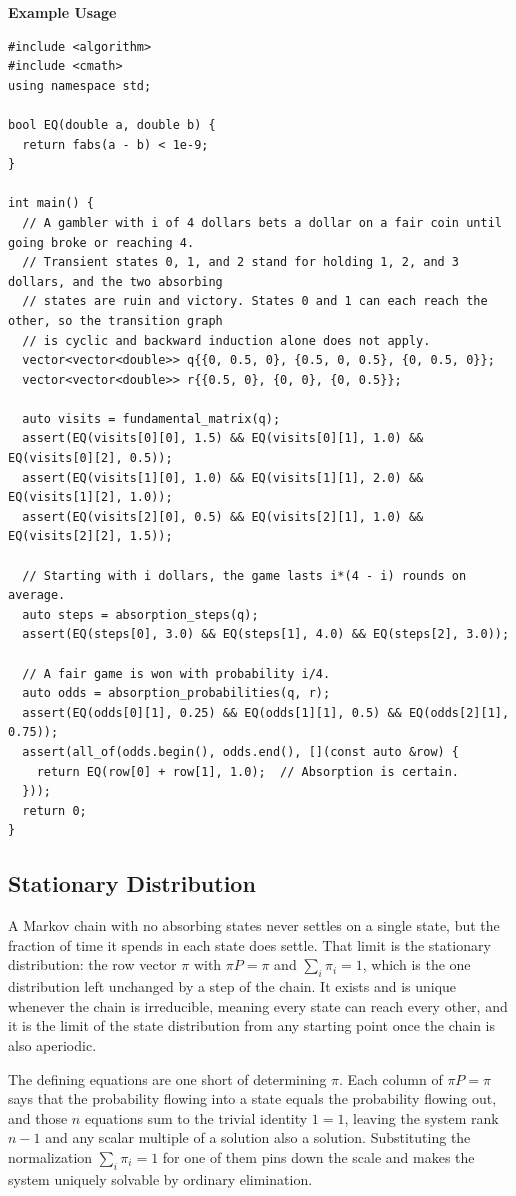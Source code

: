 \textbf{Example Usage}\par
\begin{lstlisting}[style=cpp]
#include <algorithm>
#include <cmath>
using namespace std;

bool EQ(double a, double b) {
  return fabs(a - b) < 1e-9;
}

int main() {
  // A gambler with i of 4 dollars bets a dollar on a fair coin until going broke or reaching 4.
  // Transient states 0, 1, and 2 stand for holding 1, 2, and 3 dollars, and the two absorbing
  // states are ruin and victory. States 0 and 1 can each reach the other, so the transition graph
  // is cyclic and backward induction alone does not apply.
  vector<vector<double>> q{{0, 0.5, 0}, {0.5, 0, 0.5}, {0, 0.5, 0}};
  vector<vector<double>> r{{0.5, 0}, {0, 0}, {0, 0.5}};

  auto visits = fundamental_matrix(q);
  assert(EQ(visits[0][0], 1.5) && EQ(visits[0][1], 1.0) && EQ(visits[0][2], 0.5));
  assert(EQ(visits[1][0], 1.0) && EQ(visits[1][1], 2.0) && EQ(visits[1][2], 1.0));
  assert(EQ(visits[2][0], 0.5) && EQ(visits[2][1], 1.0) && EQ(visits[2][2], 1.5));

  // Starting with i dollars, the game lasts i*(4 - i) rounds on average.
  auto steps = absorption_steps(q);
  assert(EQ(steps[0], 3.0) && EQ(steps[1], 4.0) && EQ(steps[2], 3.0));

  // A fair game is won with probability i/4.
  auto odds = absorption_probabilities(q, r);
  assert(EQ(odds[0][1], 0.25) && EQ(odds[1][1], 0.5) && EQ(odds[2][1], 0.75));
  assert(all_of(odds.begin(), odds.end(), [](const auto &row) {
    return EQ(row[0] + row[1], 1.0);  // Absorption is certain.
  }));
  return 0;
}
\end{lstlisting}
\subsection{Stationary Distribution}
\label{sec:6.7.4}
A Markov chain with no absorbing states never settles on a single state, but the fraction of time it spends in each state does settle. That limit is the stationary distribution: the row vector $\pi$ with $\pi P = \pi$ and $\sum_i \pi_i = 1$, which is the one distribution left unchanged by a step of the chain. It exists and is unique whenever the chain is irreducible, meaning every state can reach every other, and it is the limit of the state distribution from any starting point once the chain is also aperiodic.

The defining equations are one short of determining $\pi$. Each column of $\pi P = \pi$ says that the probability flowing into a state equals the probability flowing out, and those $n$ equations sum to the trivial identity $1 = 1$, leaving the system rank $n - 1$ and any scalar multiple of a solution also a solution. Substituting the normalization $\sum_i \pi_i = 1$ for one of them pins down the scale and makes the system uniquely solvable by ordinary elimination.

